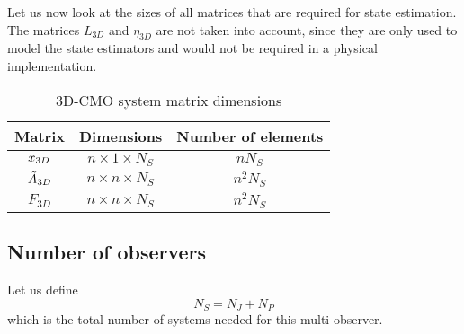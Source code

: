 Let us now look at the sizes of all matrices that are required for state estimation. The matrices $L_{3D}$ and $\eta_{3D}$ are not taken into account, since they are only used to model the state estimators and would not be required in a physical implementation.
\begin{table}[h]
    \centering
    \begin{tabular}{c|c|c}
       Matrix  & Dimensions & Number of elements \\ \hline
       $\Tilde{x}_{3D}$  & $ n \times 1 \times N_S$ & $nN_S$ \\
       $\Tilde{A}_{3D}$ & $n \times n \times N_S$ & $n^2N_S$ \\ 
       $F_{3D}$ & $n \times n \times N_S$ & $n^2N_S$ \\
       
    \end{tabular}
    \caption{3D-CMO system matrix dimensions}
    \label{tab:3D-CMO-dimensions}
\end{table}


\subsection{Number of observers}
Let us define
\begin{equation}
    N_S = N_J + N_P
\end{equation}
which is the total number of systems needed for this multi-observer.\\

